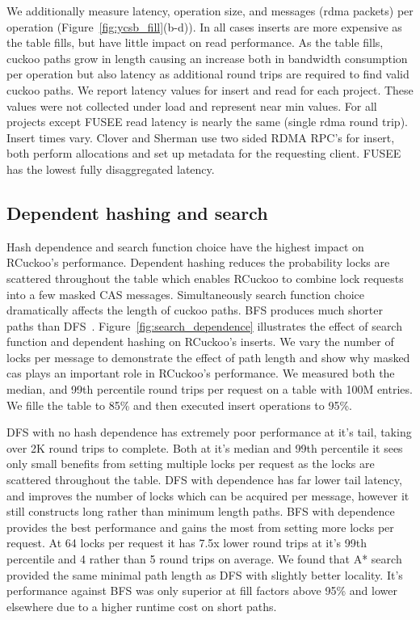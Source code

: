 We additionally measure latency, operation size, and
messages (rdma packets) per operation
(Figure~\ref{fig:ycsb_fill}(b-d)). In all cases inserts are
more expensive as the table fills, but have little impact on
read performance. As the table fills, cuckoo paths grow in
length causing an increase both in bandwidth consumption per
operation but also latency as additional round trips are
required to find valid cuckoo paths. We report latency
values for insert and read for each project. These values
were not collected under load and represent near min values.
For all projects except FUSEE read latency is nearly the
same (single rdma round trip). Insert times vary. Clover and
Sherman use two sided RDMA RPC's for insert, both perform
allocations and set up metadata for the requesting client.
FUSEE has the lowest fully disaggregated latency.

\subsection{Dependent hashing and search}

Hash dependence and search function choice have the highest
impact on RCuckoo's performance. Dependent hashing reduces
the probability locks are scattered throughout the table
which enables RCuckoo to combine lock requests into a few
masked CAS messages. Simultaneously search function choice
dramatically affects the length of cuckoo paths. BFS
produces much shorter paths than
DFS~\cite{cuckoo-improvements,pilaf,cuckoo}.
Figure~\ref{fig:search_dependence} illustrates the effect of
search function and dependent hashing on RCuckoo's inserts.
We vary the number of locks per message to demonstrate the
effect of path length and show why masked cas plays an
important role in RCuckoo's performance. We measured both
the median, and 99th percentile round trips per request on a
table with 100M entries. We fille the table to 85\% and then
executed insert operations to 95\%.

DFS with no hash dependence has extremely poor performance
at it's tail, taking over 2K round trips to complete. Both
at it's median and 99th percentile it sees only small
benefits from setting multiple locks per request as the
locks are scattered throughout the table. DFS with
dependence has far lower tail latency, and improves the
number of locks which can be acquired per message, however
it still constructs long rather than minimum length paths.
BFS with dependence provides the best performance and gains
the most from setting more locks per request. At 64 locks
per request it has 7.5x lower round trips at it's 99th
percentile and 4 rather than 5 round trips on average. We
found that A* search provided the same minimal path length
as DFS with slightly better locality. It's performance
against BFS was only superior at fill factors above 95\% and
lower elsewhere due to a higher runtime cost on short paths.



